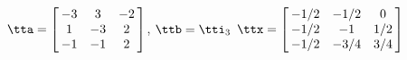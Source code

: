 {$\tta = \left[\hskip -3pt \begin{array}{ccc} -3&3&-2 \\    1&-3&2 \\    -1&-1&2\end{array}\hskip -3pt \right] $, 
 \quad
$\ttb=\tti_3 $}
{$\ttx=\left[\hskip -3pt \begin{array}{ccc} -1/2 & -1/2 & 0\\    -1/2 & -1 & 1/2 \\    -1/2 & -3/4 & 3/4  \end{array}\hskip -3pt \right] $}
